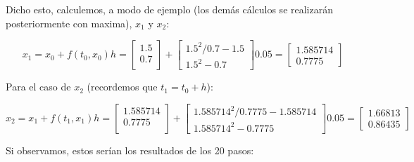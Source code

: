 \documentclass[12pt]{article}       %
\begin{document}
Dicho esto, calculemos, a modo de ejemplo (los demás cálculos se realizarán posteriormente con maxima), $x_1$ y $x_2$:

\begin{equation*}
x_1=x_0+f(t_0,x_0)h=\begin{bmatrix}
1.5\\
0.7\\
\end{bmatrix} + \begin{bmatrix}
1.5^2/0.7 - 1.5\\
1.5^2 - 0.7
\end{bmatrix}0.05=\begin{bmatrix}
1.585714\\
0.7775
\end{bmatrix}  
\end{equation*}

Para el caso de $x_2$ (recordemos que $t_1=t_0+h$):

\begin{equation*}
x_2=x_1+f(t_1,x_1)h=\begin{bmatrix}
1.585714\\
0.7775\\
\end{bmatrix} + \begin{bmatrix}
1.585714^2/0.7775 - 1.585714\\
1.585714^2 - 0.7775
\end{bmatrix}0.05=\begin{bmatrix}
1.66813\\
0.86435
\end{bmatrix}  
\end{equation*}

Si observamos, estos serían los resultados de los 20 pasos:
\end{document}

